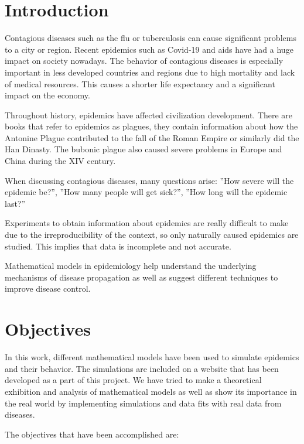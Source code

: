 \section*{Introduction}

Contagious diseases such as the flu or tuberculosis can cause significant problems to a city or region. Recent epidemics such as Covid-19 and aids have had a huge impact on society nowadays. The behavior of contagious diseases is especially important in less developed countries and regions due to high mortality and lack of medical resources. This causes a shorter life expectancy and a significant impact on the economy.

Throughout history, epidemics have affected civilization development. There are books that refer to epidemics as plagues, they contain information about how the Antonine Plague contributed to the fall of the Roman Empire or similarly did the Han Dinasty. The bubonic plague also caused severe problems in Europe and China during the XIV century.

When discussing contagious diseases, many questions arise: ''How severe will the epidemic be?'', ''How many people will get sick?'', ''How long will the epidemic last?''

Experiments to obtain information about epidemics are really difficult to make due to the irreproducibility of the context, so only naturally caused epidemics are studied. This implies that data is incomplete and not accurate.

Mathematical models in epidemiology help understand the underlying mechanisms of disease propagation as well as suggest different techniques to improve disease control.

\section*{Objectives}

In this work, different mathematical models have been used to simulate epidemics and their behavior. The simulations are included on a website that has been developed as a part of this project. We have tried to make a theoretical exhibition and analysis of mathematical models as well as show its importance in the real world by implementing simulations and data fits with real data from diseases.

The objectives that have been accomplished are:

